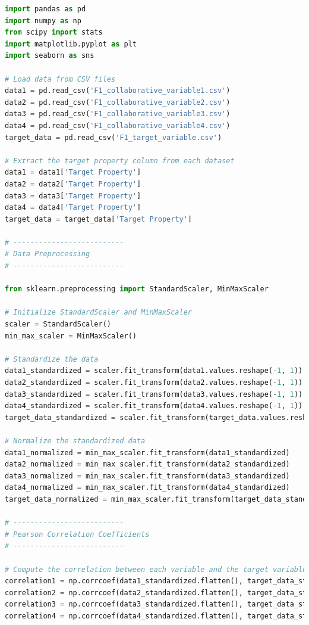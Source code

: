 \documentclass{swmcmthesis}
\begin{document}
\begin{lstlisting}[language=python,caption={The python programme for Problem 2}]
import pandas as pd
import numpy as np
from scipy import stats
import matplotlib.pyplot as plt
import seaborn as sns

# Load data from CSV files
data1 = pd.read_csv('F1_collaborative_variable1.csv')
data2 = pd.read_csv('F1_collaborative_variable2.csv')
data3 = pd.read_csv('F1_collaborative_variable3.csv')
data4 = pd.read_csv('F1_collaborative_variable4.csv')
target_data = pd.read_csv('F1_target_variable.csv')

# Extract the target property column from each dataset
data1 = data1['Target Property']
data2 = data2['Target Property']
data3 = data3['Target Property']
data4 = data4['Target Property']
target_data = target_data['Target Property']

# --------------------------
# Data Preprocessing
# --------------------------

from sklearn.preprocessing import StandardScaler, MinMaxScaler

# Initialize StandardScaler and MinMaxScaler
scaler = StandardScaler()
min_max_scaler = MinMaxScaler()

# Standardize the data
data1_standardized = scaler.fit_transform(data1.values.reshape(-1, 1))
data2_standardized = scaler.fit_transform(data2.values.reshape(-1, 1))
data3_standardized = scaler.fit_transform(data3.values.reshape(-1, 1))
data4_standardized = scaler.fit_transform(data4.values.reshape(-1, 1))
target_data_standardized = scaler.fit_transform(target_data.values.reshape(-1, 1))

# Normalize the standardized data
data1_normalized = min_max_scaler.fit_transform(data1_standardized)
data2_normalized = min_max_scaler.fit_transform(data2_standardized)
data3_normalized = min_max_scaler.fit_transform(data3_standardized)
data4_normalized = min_max_scaler.fit_transform(data4_standardized)
target_data_normalized = min_max_scaler.fit_transform(target_data_standardized)

# --------------------------
# Pearson Correlation Coefficients
# --------------------------

# Compute the correlation between each variable and the target variable (using standardized data)
correlation1 = np.corrcoef(data1_standardized.flatten(), target_data_standardized.flatten())[0, 1]
correlation2 = np.corrcoef(data2_standardized.flatten(), target_data_standardized.flatten())[0, 1]
correlation3 = np.corrcoef(data3_standardized.flatten(), target_data_standardized.flatten())[0, 1]
correlation4 = np.corrcoef(data4_standardized.flatten(), target_data_standardized.flatten())[0, 1]


\end{lstlisting}
\end{document}
